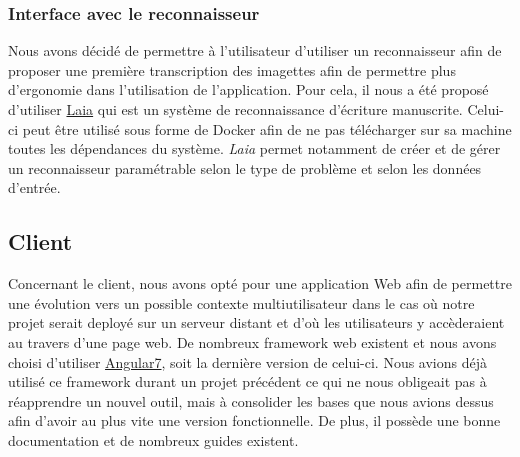\subsubsection{Interface avec le reconnaisseur}

Nous avons décidé de permettre à l'utilisateur d'utiliser un reconnaisseur afin de proposer une première transcription des imagettes afin de permettre plus d'ergonomie dans l'utilisation de l'application. Pour cela, il nous a été proposé d'utiliser \href{https://github.com/jpuigcerver/Laia}{Laia} qui est un système de reconnaissance d'écriture manuscrite. Celui-ci peut être utilisé sous forme de Docker afin de ne pas télécharger sur sa machine toutes les dépendances du système. \textit{Laia} permet notamment de créer et de gérer un reconnaisseur paramétrable selon le type de problème et selon les données d'entrée.

\subsection{Client}

Concernant le client, nous avons opté pour une application Web afin de permettre une évolution vers un possible contexte multiutilisateur dans le cas où notre projet serait deployé sur un serveur distant et d'où les utilisateurs y accèderaient au travers d'une page web. De nombreux framework web existent et nous avons choisi d'utiliser \href{https://angular.io}{Angular7}, soit la dernière version de celui-ci. Nous avions déjà utilisé ce framework durant un projet précédent ce qui ne nous obligeait pas à réapprendre un nouvel outil, mais à consolider les bases que nous avions dessus afin d'avoir au plus vite une version fonctionnelle. De plus, il possède une bonne documentation et de nombreux guides existent.